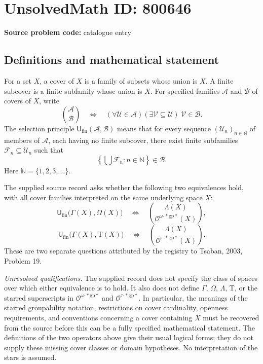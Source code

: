 \documentclass[11pt]{article}
\newcommand{\N}{\mathbb{N}}
\begin{document}
\section*{UnsolvedMath ID: 800646}
\textbf{Source problem code:} catalogue entry
\subsection{Definitions and mathematical statement}
For a set \(X\), a cover of \(X\) is a family of subsets whose union is \(X\). A finite subcover is a finite subfamily whose union is \(X\). For specified families \(\mathcal A\) and \(\mathcal B\) of covers of \(X\), write
\[
\binom{\mathcal A}{\mathcal B}
\quad\Longleftrightarrow\quad
(\forall\mathcal U\in\mathcal A)(\exists\mathcal V\subseteq\mathcal U)\;\mathcal V\in\mathcal B.
\]
The selection principle \(\mathsf U_{\mathrm{fin}}(\mathcal A,\mathcal B)\) means that for every sequence \((\mathcal U_n)_{n\in\N}\) of members of \(\mathcal A\), each having no finite subcover, there exist finite subfamilies \(\mathcal F_n\subseteq\mathcal U_n\) such that
\[
\left\{\bigcup\mathcal F_n:n\in\N\right\}\in\mathcal B.
\]
Here \(\N=\{1,2,3,\ldots\}\).

The supplied source record asks whether the following two equivalences hold, with all cover families interpreted on the same underlying space \(X\):
\[
\mathsf U_{\mathrm{fin}}\bigl(\Gamma(X),\Omega(X)\bigr)
\quad\Longleftrightarrow\quad
\binom{\Lambda(X)}{\mathcal O^{\omega\text{-}*\mathrm{gp}*}(X)},
\]
\[
\mathsf U_{\mathrm{fin}}\bigl(\Gamma(X),\mathrm T(X)\bigr)
\quad\Longleftrightarrow\quad
\binom{\Lambda(X)}{\mathcal O^{\tau\text{-}*\mathrm{gp}*}(X)}.
\]
These are two separate questions attributed by the registry to Tsaban, 2003, Problem 19.

\emph{Unresolved qualifications.} The supplied record does not specify the class of spaces over which either equivalence is to hold. It also does not define \(\Gamma\), \(\Omega\), \(\Lambda\), \(\mathrm T\), or the starred superscripts in \(\mathcal O^{\omega\text{-}*\mathrm{gp}*}\) and \(\mathcal O^{\tau\text{-}*\mathrm{gp}*}\). In particular, the meanings of the starred groupability notation, restrictions on cover cardinality, openness requirements, and conventions concerning a cover containing \(X\) must be recovered from the source before this can be a fully specified mathematical statement. The definitions of the two operators above give their usual logical forms; they do not supply these missing cover classes or domain hypotheses. No interpretation of the stars is assumed.
\end{document}

